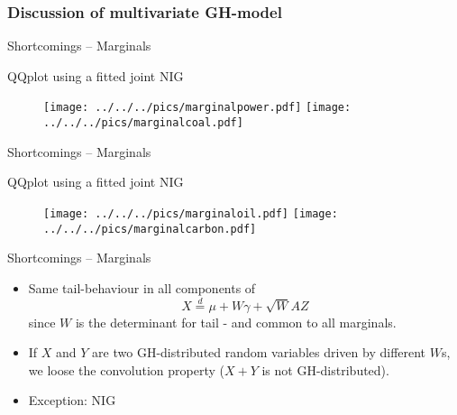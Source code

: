  \subsubsection{Discussion of multivariate GH-model}

{Shortcomings -- Marginals} %
\begin{center}
QQplot using a fitted joint NIG
\begin{figure}
\begin{center}
\texttt{[image: ../../../pics/marginalpower.pdf]}
\texttt{[image: ../../../pics/marginalcoal.pdf]}
\end{center}
\end{figure}
\end{center}



{Shortcomings -- Marginals} %
\begin{center}
QQplot using a fitted joint NIG
\begin{figure}
\begin{center}
\texttt{[image: ../../../pics/marginaloil.pdf]}
\texttt{[image: ../../../pics/marginalcarbon.pdf]}
\end{center}
\end{figure}
\end{center}




{Shortcomings -- Marginals} %
\begin{itemize}
\item Same tail-behaviour in all components of
$$X\stackrel{d}{=}\mu+W\gamma+\sqrt{W}AZ$$
since $W$ is the determinant for tail - and common to all
marginals. \item If $X$ and $Y$ are two GH-distributed random
variables driven by different $W$s, we loose the convolution
property ($X+Y$ is not GH-distributed). \item Exception: NIG
\end{itemize}


